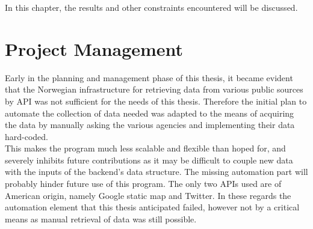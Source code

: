 
In this chapter, the results and other constraints encountered will be discussed.

\section{Project Management}

Early in the planning and management phase of this thesis, it became evident that the Norwegian infrastructure for retrieving data from various public sources by API was not sufficient for the needs of this thesis. Therefore the initial plan to automate the collection of data needed was adapted to the means of acquiring the data by manually asking the various agencies and implementing their data hard-coded.
\\
This makes the program much less scalable and flexible than hoped for, and severely inhibits future contributions as it may be difficult to couple new data with the inputs of the backend's data structure. The missing automation part will probably hinder future use of this program. The only two APIs used are of American origin, namely Google static map and Twitter. In these regards the automation element that this thesis anticipated failed, however not by a critical means as manual retrieval of data was still possible.






